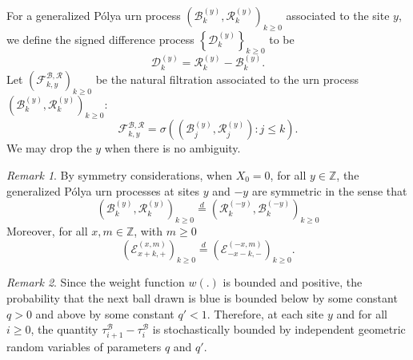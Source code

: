 \documentclass[twoside,12pt, a4paper, final]{article}
\numberwithin{equation}{section}
\theoremstyle{remark}
\newtheorem{remark}{Remark}[section]
\begin{document}
	For a generalized P\'{o}lya urn process $(\mathcal{B}^{(y)}_k,\mathcal{R}^{(y)}_k )_{k\geq 0}$ associated to the site $y$, we define the signed difference process $\left\{\mathcal{D}^{(y)}_{k}\right\}_{k \ge 0} $ to be
	\begin{equation}\label{eq:signed difference}
		\mathcal{D}^{(y)}_k  =\mathcal{R}^{(y)}_k -\mathcal{B}^{(y)}_k.  
	\end{equation}
	Let $\left(\mathcal{F}^{\mathcal{B},\mathcal{R}}_{k, y}\right)_{k \ge 0}$ be the natural filtration associated to the urn process $(\mathcal{B}^{(y)}_k,\mathcal{R}^{(y)}_k )_{k\geq 0}$:  
	\[
	\mathcal{F}^{\mathcal{B},\mathcal{R}}_{k, y} = \sigma\left((\mathcal{B}_j^{(y)},\mathcal{R}_j^{(y)} ): j\leq k \right).
	\]  
	We may drop the $y$ when there is no ambiguity.
	\begin{remark}
		\label{rem:symmetry}
		By symmetry considerations, when $X_0 = 0$, for all $y \in \mathbb{Z}$, the generalized P\'{o}lya urn processes at sites $y$ and $-y$ are symmetric in the sense that
		$$\left(\mathcal{B}^{(y)}_{k},\mathcal{R}^{(y)}_{k} \right)_{k\ge 0}
		\overset{d}{=} 
		\left(\mathcal{R}^{(-y)}_{k},\mathcal{B}^{(-y)}_{k} \right)_{k\ge 0} $$
		Moreover, for all $x, m \in \mathbb{Z}$, with $m\geq 0$
		\[
		\left(\mathcal{E}^{(x,m)}_{x+k,+} \right)_{k\geq 0} \overset{d}{=} \left(\mathcal{E}^{(-x,m)}_{-x-k,-} \right)_{k\geq 0}.
		\]
	\end{remark}
	\begin{remark}
		\label{rk:UrnGeo}
		Since the weight function $w(.)$ is bounded and positive, the probability that the next ball drawn is blue is bounded below by some constant $q > 0$ and above by some constant $q' < 1$. Therefore, at each site $y$ and for all $i \ge 0$, the quantity $\tau_{i+1}^{\mathcal{B}} - \tau_{i}^{\mathcal{B}}$ is stochastically bounded by independent geometric random variables of parameters $q$ and $q'$. 
	\end{remark}
	
\end{document}
